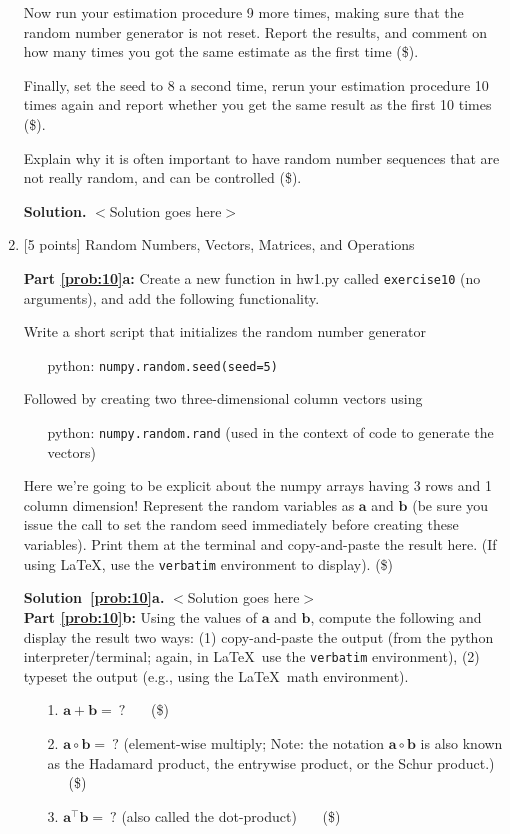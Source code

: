 \documentclass[10pt]{article}
\begin{document}
\begin{enumerate}
Now run your estimation procedure 9 more times, making sure that the random number generator is not reset.  Report the results, and comment on how many times you got the same estimate as the first time (\$).

Finally, set the seed to 8 a second time, rerun your estimation procedure 10 times again and report whether you get the same result as the first 10 times (\$).

Explain why it is often important to have random number sequences that are not really random, and can be controlled (\$).

{\bf Solution.} $<$Solution goes here$>$\\


\item \label{prob:10} [5 points] Random Numbers, Vectors, Matrices, and Operations

{\bf Part \ref{prob:10}a:} Create a new function in hw1.py called {\tt exercise10} (no arguments), and add the following functionality.

Write a short script that initializes the random number generator
\begin{itemize}
\item[] python: {\tt numpy.random.seed(seed=5)}
\end{itemize}
Followed by creating two three-dimensional column vectors using
\begin{itemize}
\item[] python: {\tt numpy.random.rand} (used in the context of code to generate the vectors)
\end{itemize}
Here we're going to be explicit about the numpy arrays having 3 rows and 1 column dimension!
Represent the random variables as $\mathbf{a}$ and $\mathbf{b}$ (be sure you issue the call to set the random seed immediately before creating these variables).  Print them at the terminal and copy-and-paste the result here. (If using \LaTeX, use the {\tt verbatim} environment to display). (\$)

{\bf Solution~\ref{prob:10}a.} $<$Solution goes here$>$\\

{\bf Part \ref{prob:10}b:} Using the values of $\mathbf{a}$ and $\mathbf{b}$, compute the following and display the result two ways: (1) copy-and-paste the output (from the python interpreter/terminal; again, in \LaTeX~use the {\tt verbatim} environment), (2) typeset the output (e.g., using the \LaTeX~math environment).
\begin{enumerate}
\item[1.] $\mathbf{a} + \mathbf{b} = ~?$ ~~~(\$)
\item[2.] $\mathbf{a} \circ \mathbf{b} = ~?$  (element-wise multiply; Note: the notation $\mathbf{a} \circ \mathbf{b}$ is also known as the Hadamard product, the entrywise product, or the Schur product.) ~~~(\$)
\item[3.] $\mathbf{a}^\top \mathbf{b} = ~?$  (also called the dot-product) ~~~(\$)
\end{enumerate}


\end{enumerate}
\end{document}
